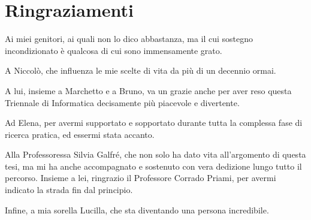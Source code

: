 \chapter*{Ringraziamenti}

Ai miei genitori, ai quali non lo dico abbastanza, ma il cui sostegno
incondizionato è qualcosa di cui sono immensamente grato.

\bigskip

A Niccolò, che influenza le mie scelte di vita da più di un decennio ormai.

\bigskip

A lui, insieme a Marchetto e a Bruno, va un grazie anche per aver reso questa
Triennale di Informatica decisamente più piacevole e divertente.

\bigskip

Ad Elena, per avermi supportato e sopportato
durante tutta la complessa fase di ricerca pratica, ed essermi stata accanto.

\bigskip

Alla Professoressa Silvia Galfré, che non solo ha dato vita
all'argomento di questa tesi, ma mi ha anche accompagnato e sostenuto con
vera dedizione lungo tutto il percorso. Insieme a lei, ringrazio il Professore
Corrado Priami, per avermi indicato la strada fin dal principio.

\bigskip

Infine, a mia sorella Lucilla, che sta diventando una persona incredibile.

